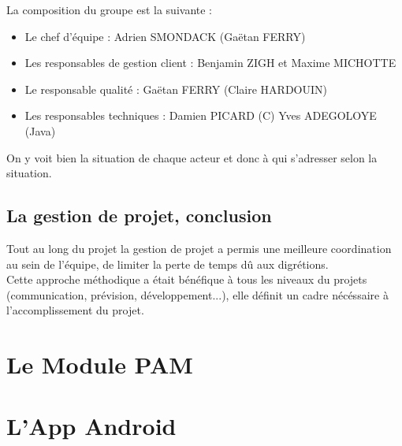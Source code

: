 La composition du groupe est la suivante :
\begin{itemize}
\item Le chef d'équipe : Adrien SMONDACK (Gaëtan FERRY)
\item Les responsables de gestion client : Benjamin ZIGH et Maxime MICHOTTE
\item Le responsable qualité : Gaëtan FERRY (Claire HARDOUIN)
\item Les responsables techniques : Damien PICARD (C) Yves ADEGOLOYE (Java)
\end{itemize}

On y voit bien la situation de chaque acteur et donc à qui s'adresser selon la situation.


\subsection{La gestion de projet, conclusion}

Tout au long du projet la gestion de projet a permis une meilleure coordination au sein de l'équipe, de limiter la perte de temps dû aux digrétions.\\

Cette approche méthodique a était bénéfique à tous les niveaux du projets (communication, prévision, développement...), elle définit un cadre nécéssaire à l'accomplissement du projet.\\



\section{Le Module PAM}

\section{L'App Android}
